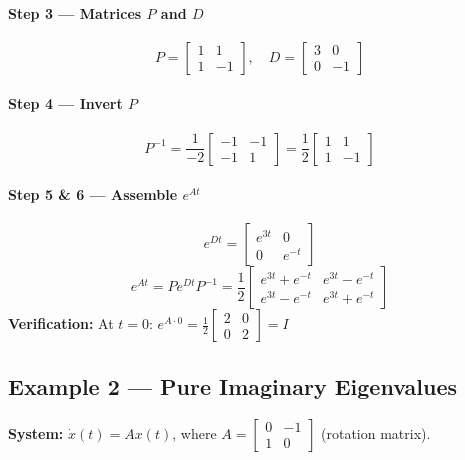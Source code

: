 \documentclass[11pt,a4paper]{article}
\begin{document}
\paragraph{Step 3 --- Matrices $P$ and $D$}
\begin{equation*}
P = \begin{bmatrix} 1 & 1 \\ 1 & -1 \end{bmatrix}, \quad D = \begin{bmatrix} 3 & 0 \\ 0 & -1 \end{bmatrix}
\end{equation*}

\paragraph{Step 4 --- Invert $P$}
\begin{equation*}
P^{-1} = \frac{1}{-2} \begin{bmatrix} -1 & -1 \\ -1 & 1 \end{bmatrix} = \frac{1}{2} \begin{bmatrix} 1 & 1 \\ 1 & -1 \end{bmatrix}
\end{equation*}

\paragraph{Step 5 \& 6 --- Assemble $e^{At}$}
\begin{equation*}
e^{Dt} = \begin{bmatrix} e^{3t} & 0 \\ 0 & e^{-t} \end{bmatrix}
\end{equation*}
\begin{equation*}
e^{At} = P e^{Dt} P^{-1} = \frac{1}{2} \begin{bmatrix} e^{3t}+e^{-t} & e^{3t}-e^{-t} \\ e^{3t}-e^{-t} & e^{3t}+e^{-t} \end{bmatrix}
\end{equation*}
\textbf{Verification:} At $t = 0$: $e^{A \cdot 0} = \frac{1}{2}\begin{bmatrix} 2 & 0 \\ 0 & 2 \end{bmatrix} = I$ \checkmark

\subsection{Example 2 --- Pure Imaginary Eigenvalues}
\textbf{System:} $\dot{x}(t) = Ax(t)$, where $A = \begin{bmatrix} 0 & -1 \\ 1 & 0 \end{bmatrix}$ (rotation matrix).
\end{document}
